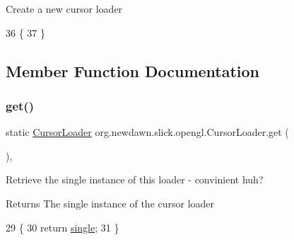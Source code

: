 Create a new cursor loader 
\begin{DoxyCode}
36                            \{
37     \}
\end{DoxyCode}


\subsection{Member Function Documentation}
\mbox{\label{classorg_1_1newdawn_1_1slick_1_1opengl_1_1_cursor_loader_acbc2feefd76526fce430c5e935831f7e}} 
\subsubsection{\texorpdfstring{get()}{get()}}
{\footnotesize\ttfamily static \mbox{\hyperlink{classorg_1_1newdawn_1_1slick_1_1opengl_1_1_cursor_loader}{Cursor\+Loader}} org.\+newdawn.\+slick.\+opengl.\+Cursor\+Loader.\+get (\begin{DoxyParamCaption}{ }\end{DoxyParamCaption})\hspace{0.3cm}{\ttfamily [inline]}, {\ttfamily [static]}}

Retrieve the single instance of this loader -\/ convinient huh?

\begin{DoxyReturn}{Returns}
The single instance of the cursor loader 
\end{DoxyReturn}

\begin{DoxyCode}
29                                      \{
30         \textcolor{keywordflow}{return} \mbox{\hyperlink{classorg_1_1newdawn_1_1slick_1_1opengl_1_1_cursor_loader_a0550bb212ff0bdb84ff32b244360c40e}{single}};
31     \}
\end{DoxyCode}
\mbox{\label{classorg_1_1newdawn_1_1slick_1_1opengl_1_1_cursor_loader_af5c88d9adc8a074148976143c1e6ca4f}} 

